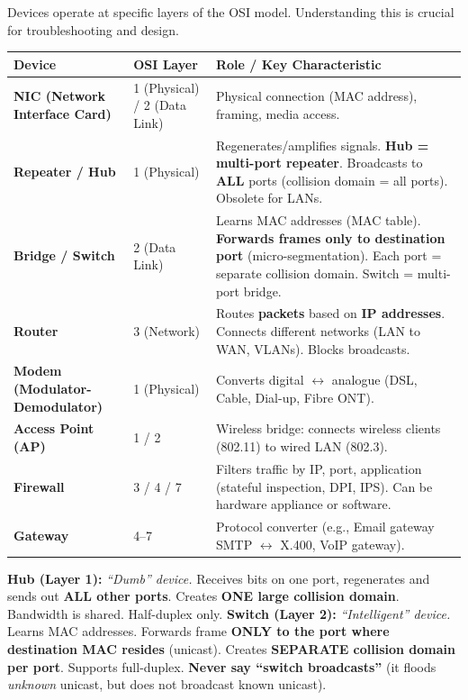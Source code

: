 \documentclass[11pt]{article}
\newcounter{popsec}
\newcounter{popsub}
\newcommand{\courssub}[1]{%
  \stepcounter{popsub}%
  \par\vspace{9pt}\noindent{\popxbold\fontsize{11.5}{13}\selectfont\color{popink}{\color{poporange}\thepopsec.\thepopsub}\hspace{6pt}#1}\par\nopagebreak\vspace{4pt}
}
\begin{document}
\courssub{Network Devices and their Layers}

Devices operate at specific layers of the OSI model. Understanding this is crucial for troubleshooting and design.

\begin{center}
\begin{tabularx}{\linewidth}{|l|l|X|}
\hline
\rowcolor{popblueL}
\textbf{Device} & \textbf{OSI Layer} & \textbf{Role / Key Characteristic} \\
\hline
\textbf{NIC (Network Interface Card)} & 1 (Physical) / 2 (Data Link) & Physical connection (MAC address), framing, media access. \\
\hline
\textbf{Repeater / Hub} & 1 (Physical) & Regenerates/amplifies signals. \textbf{Hub = multi-port repeater}. Broadcasts to \textbf{ALL} ports (collision domain = all ports). Obsolete for LANs. \\
\hline
\textbf{Bridge / Switch} & 2 (Data Link) & Learns MAC addresses (MAC table). \textbf{Forwards frames only to destination port} (micro-segmentation). Each port = separate collision domain. Switch = multi-port bridge. \\
\hline
\textbf{Router} & 3 (Network) & Routes \textbf{packets} based on \textbf{IP addresses}. Connects different networks (LAN to WAN, VLANs). Blocks broadcasts. \\
\hline
\textbf{Modem (Modulator-Demodulator)} & 1 (Physical) & Converts digital $\leftrightarrow$ analogue (DSL, Cable, Dial-up, Fibre ONT). \\
\hline
\textbf{Access Point (AP)} & 1 / 2 & Wireless bridge: connects wireless clients (802.11) to wired LAN (802.3). \\
\hline
\textbf{Firewall} & 3 / 4 / 7 & Filters traffic by IP, port, application (stateful inspection, DPI, IPS). Can be hardware appliance or software. \\
\hline
\textbf{Gateway} & 4--7 & Protocol converter (e.g., Email gateway SMTP $\leftrightarrow$ X.400, VoIP gateway). \\
\hline
\end{tabularx}
\end{center}

\begin{attention}
\textbf{Hub (Layer 1):} \emph{``Dumb'' device.} Receives bits on one port, regenerates and sends out \textbf{ALL other ports}. Creates \textbf{ONE large collision domain}. Bandwidth is shared. Half-duplex only.
\textbf{Switch (Layer 2):} \emph{``Intelligent'' device.} Learns MAC addresses. Forwards frame \textbf{ONLY to the port where destination MAC resides} (unicast). Creates \textbf{SEPARATE collision domain per port}. Supports full-duplex. \textbf{Never say ``switch broadcasts''} (it floods \emph{unknown} unicast, but does not broadcast known unicast).
\end{attention}
\end{document}
